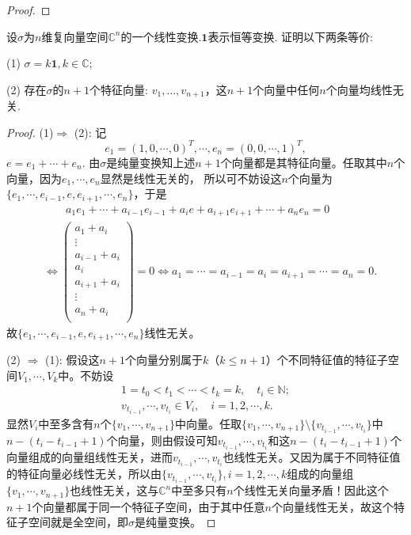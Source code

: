 \documentclass[../../main.tex]{subfiles}
\begin{document}
\begin{proof}
\end{proof}

\begin{example}
设\(\sigma\)为\(n\)维复向量空间\(\mathbb{C}^n\)的一个线性变换.\(\mathbf{1}\)表示恒等变换. 证明以下两条等价:

(1) \(\sigma = k\mathbf{1}, k \in \mathbb{C}\);

(2) 存在\(\sigma\)的\(n + 1\)个特征向量: \(v_1, \dots, v_{n+1}\)，这\(n + 1\)个向量中任何\(n\)个向量均线性无关.
\end{example}
\begin{proof}
(1)$\Longrightarrow$ (2): 记
$$e_1=(1,0,\cdots,0)^T,\cdots,e_n=(0,0,\cdots,1)^T,$$
$e=e_1+\cdots+e_n$.
由$\sigma$是纯量变换知上述$n+1$个向量都是其特征向量。任取其中$n$个向量，因为$e_1,\cdots,e_n$显然是线性无关的，
所以可不妨设这$n$个向量为$\{e_1,\cdots,e_{i-1},e,e_{i+1},\cdots,e_n\}$，于是
\begin{align*}
&\quad \quad a_1e_1+\cdots +a_{i-1}e_{i-1}+a_ie+a_{i+1}e_{i+1}+\cdots +a_ne_n=0
\\
&\Longleftrightarrow \left( \begin{array}{c}
a_1+a_i\\
\vdots\\
a_{i-1}+a_i\\
a_i\\
a_{i+1}+a_i\\
\vdots\\
a_n+a_i\\
\end{array} \right) =0\Longleftrightarrow a_1=\cdots =a_{i-1}=a_i=a_{i+1}=\cdots =a_n=0.
\end{align*}
故$\{e_1,\cdots,e_{i-1},e,e_{i+1},\cdots,e_n\}$线性无关。

(2) $\Longrightarrow$ (1): 假设这$n+1$个向量分别属于$k$（$k\leqslant n+1$）个不同特征值的特征子空间$V_1,\cdots,V_k$中。不妨设
\begin{gather*}
1=t_0<t_1<\cdots<t_k=k,\quad t_i\in \mathbb{N};
\\
v_{t_{i-1}},\cdots,v_{t_i}\in V_i,\quad i=1,2,\cdots,k.
\end{gather*}
显然$V_i$中至多含有$n$个$\{v_1,\cdots,v_{n+1}\}$中向量。任取$\{v_1,\cdots,v_{n+1}\}\setminus\{v_{t_{i-1}},\cdots,v_{t_i}\}$中$n-(t_i-t_{i-1}+1)$个向量，则由假设可知$v_{t_{i-1}},\cdots,v_{t_i}$和这$n-(t_i-t_{i-1}+1)$个向量组成的向量组线性无关，进而$v_{t_{i-1}},\cdots,v_{t_i}$也线性无关。又因为属于不同特征值的特征向量必线性无关，所以由$\{v_{t_{i-1}},\cdots,v_{t_i}\},i=1,2,\cdots,k$组成的向量组$\{v_1,\cdots,v_{n+1}\}$也线性无关，这与$\mathbb{C}^n$中至多只有$n$个线性无关向量矛盾！因此这个$n+1$个向量都属于同一个特征子空间，由于其中任意$n$个向量线性无关，故这个特征子空间就是全空间，即$\sigma$是纯量变换。

\end{proof}
\end{document}
